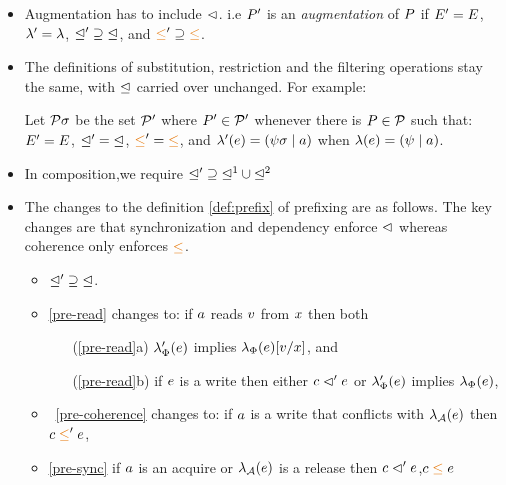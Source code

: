\begin{itemize}
\item 
Augmentation has to include ${\vartriangleleft}$. i.e 
$P'$ is an \emph{augmentation} of $P$ if $E'=E$,
  ${\lambda'}={\lambda}$, ${\trianglelefteq'}\supseteq{\trianglelefteq}$, and
  ${\gtN'}\supseteq{\gtN}$.

\item The definitions of substitution, restriction and the filtering operations  stay the same, with $\trianglelefteq$ carried over unchanged.  For example:
\begin{definition}
Let $\mathcal{P}\sigma$ be the set $\mathcal{P}'$ where $P'\in\mathcal{P}'$ whenever
there is $P\in\mathcal{P}$ such that:
$E' = E$,
${\trianglelefteq'} = {\trianglelefteq}$, 
${\gtN'} = {\gtN}$,
and
$\lambda'(e) = (\psi\sigma \mid a)$ when $\lambda(e) = (\psi \mid a)$.
\end{definition}

\item In composition,we require ${\trianglelefteq'}\supseteq{\trianglelefteq^1}\cup{\trianglelefteq^2}$

\item The changes to the definition \ref{def:prefix} of prefixing are as follows.  The key changes are that synchronization and dependency enforce $\vartriangleleft$ whereas coherence only enforces $\gtN$. 
\begin{itemize}
\item ${\trianglelefteq'}\supseteq{\trianglelefteq}$.

\item \ref{pre-read} changes to: if $a$ reads $v$ from $x$ then both
  \begin{enumerate}
  \item[(\ref{pre-read}a)] $\lambda_{\Phi}'(e)$ implies $\lambda_{\Phi}(e)[v/x]$, and
  \item[(\ref{pre-read}b)] if $e$ is a write then either $c\vartriangleleft'e$
    or $\lambda_{\Phi}'(e)$ implies $\lambda_{\Phi}(e)$,
  \end{enumerate}

\item ~\ref{pre-coherence} changes to:
 if $a$ is a write that conflicts with $\lambda_{\mathcal{A}}(e)$ 
    then $\cEv \gtN' \aEv$,

\item \ref{pre-sync} if $a$ is an acquire or $\lambda_{\mathcal{A}}(e)$ is a release then $c \vartriangleleft' e$,$\cEv \gtN \aEv$
\end{itemize}
\end{itemize}

